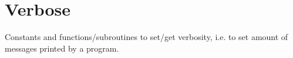 \section{Verbose}

Constants and functions/subroutines to set/get verbosity, i.e. to set
amount of messages printed by a program.
